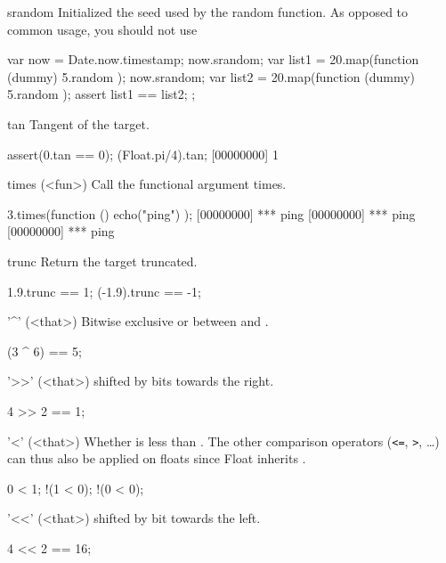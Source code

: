 \begin{urbiscriptapi}
\item[srandom]
  Initialized the seed used by the random function.  As opposed to common
  usage, you should not use
\begin{urbiunchecked}
{
  var now = Date.now.timestamp;
  now.srandom;
  var list1 = 20.map(function (dummy) { 5.random });
  now.srandom;
  var list2 = 20.map(function (dummy) { 5.random });
  assert
  {
    list1 == list2;
  }
};
\end{urbiunchecked}

\item[tan]
  Tangent of the target.
\begin{urbiscript}
assert(0.tan == 0);
(Float.pi/4).tan;
[00000000] 1
\end{urbiscript}

\item[times](<fun>)%
  Call the functional argument  \this times.

\begin{urbiscript}
3.times(function () { echo("ping") });
[00000000] *** ping
[00000000] *** ping
[00000000] *** ping
\end{urbiscript}


\item[trunc]
  Return the target truncated.
\begin{urbiassert}
1.9.trunc == 1;
(-1.9).trunc == -1;
\end{urbiassert}

\item['^'](<that>)%
  Bitwise exclusive or between \this and .
\begin{urbiassert}
(3 ^ 6) == 5;
\end{urbiassert}

\item['>>'](<that>)%
  \this shifted by  bits towards the right.
\begin{urbiassert}
4 >> 2 == 1;
\end{urbiassert}

\item['<'](<that>)%
  Whether \this is less than . The other comparison operators
  (\lstinline|<=|, \lstinline|>|, \ldots) can thus also be applied on floats
  since Float inherits .
\begin{urbiassert}
  0 < 1;
!(1 < 0);
!(0 < 0);
\end{urbiassert}

\item['<<'](<that>)%
  \this shifted by  bit towards the left.
\begin{urbiassert}
4 << 2 == 16;
\end{urbiassert}


\end{urbiscriptapi}
